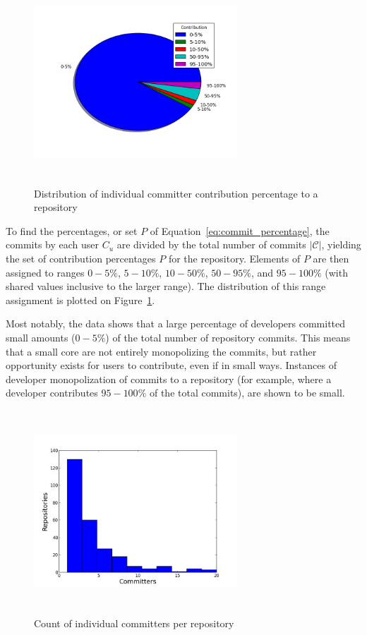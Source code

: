\documentclass{proc}
\begin{document}
{{{{{\begin{figure}
\includegraphics[height=3in,width=3in]{images/committers_percentage_pie_chart.png}
\caption{Distribution of individual committer contribution percentage to a repository}
\label{fig:committers_percentage_pie_chart}
\end{figure}

To find the percentages, or set $P$ of Equation~\ref{eq:commit_percentage}, the commits by each user $C_u$ are divided by the total number of commits $|\mathscr{C}|$, yielding the set of contribution percentages $P$ for the repository. Elements of $P$ are then assigned to ranges $0-5\%$, $5-10\%$, $10-50\%$, $50-95\%$, and $95-100\%$ (with shared values inclusive to the larger range). The distribution of this range assignment is plotted on Figure~\ref{fig:committers_percentage_pie_chart}.

Most notably, the data shows that a large percentage of developers committed small amounts ($0-5\%$) of the total number of repository commits. This means that a small core are not entirely monopolizing the commits, but rather opportunity exists for users to contribute, even if in small ways. Instances of developer monopolization of commits to a repository (for example, where a developer contributes $95-100\%$ of the total commits), are shown to be small.

\begin{figure}
\includegraphics[height=3in,width=3in]{images/committers_histogram.png}
\caption{Count of individual committers per repository}
\label{fig:committers_histogram}
\end{figure}

}}}}}
\end{document}
